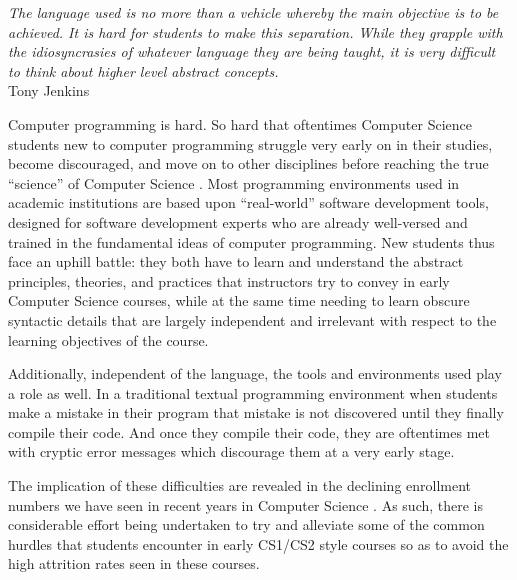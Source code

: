 \label{chapter:introduction}

\begin{flushright}
\textit{The language used is no more than a vehicle whereby the main objective is to be achieved. It is hard for students to make this separation. While they grapple with the idiosyncrasies of whatever language they are being taught, it is very difficult to think about higher level abstract concepts.}
\\
Tony Jenkins \cite{Jenkins02} \\
\end{flushright}

Computer programming is hard.  So hard that oftentimes Computer Science students new to computer programming struggle
very early on in their studies, become discouraged, and move on to other disciplines before reaching the true ``science'' of Computer Science \cite{Beaubouef05}.  Most programming environments used in academic institutions are based upon ``real-world'' software development tools, designed for software development experts who are already well-versed and trained in the fundamental ideas of computer programming.  New students thus face an uphill battle: they both have to learn and understand the abstract principles, theories, and practices that instructors try to convey in early Computer Science courses, while at the same time needing to learn obscure syntactic details that are largely independent and irrelevant with respect to the learning objectives of the course.

Additionally, independent of the language, the tools and environments used play a role as well.  In a traditional textual programming environment when students make a mistake in their program that mistake is not discovered until they finally compile their code.  And once they compile their code, they are oftentimes met with cryptic error messages which discourage them at a very early stage\cite{Jenkins02,Hundhausen09,Kelleher05}.

The implication of these difficulties are revealed in the declining enrollment numbers we have seen in recent years in Computer Science \cite{Manaris07,Vesgo07,Ward08,Bayliss09}.  As such, there is considerable effort being undertaken to try and alleviate some of the common hurdles that students encounter in early CS1/CS2 style courses so as to avoid the high attrition rates seen in these courses.

